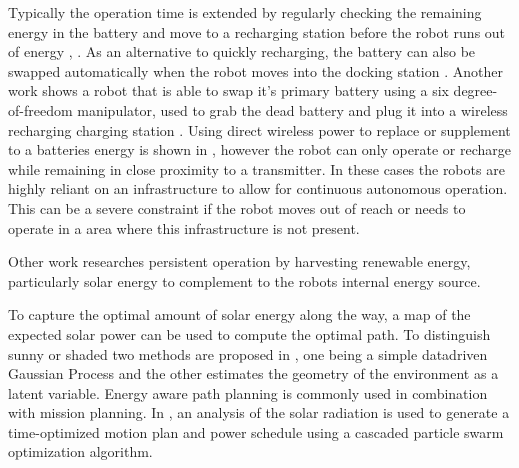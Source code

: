 \documentclass[letterpaper, 10 pt, conference]{ieeeconf}  %
\begin{document}
\cite{karpelson_icra_2014}





Typically the operation time is extended by regularly checking the remaining energy in the battery and move to a recharging station before the robot runs out of energy \cite{pickem_icra_2015}, \cite{rubenstein_icra_2012}.
As an alternative to quickly recharging, the battery can also be swapped automatically when the robot moves into the docking station \cite{kemal_mech_2015}.
Another work shows a robot that is able to swap it's primary battery using a six degree-of-freedom manipulator, used to grab the dead battery and plug it into a wireless recharging charging station \cite{zhang_conel_2013}.
Using direct wireless power to replace or supplement to a batteries energy is shown in \cite{karpelson_icra_2014}, however the robot can only operate or recharge while remaining in close proximity to a transmitter. 
In these cases the robots are highly reliant on an infrastructure to allow for continuous autonomous operation.
This can be a severe constraint if the robot moves out of reach or needs to operate in a area where this infrastructure is not present.

Other work researches persistent operation by harvesting renewable energy, particularly solar energy to complement to the robots internal energy source.


To capture the optimal amount of solar energy along the way, a map of the expected solar power can be used to compute the optimal path. To distinguish sunny or shaded two methods are proposed in \cite{plonski_tranro_2016}, one being a simple datadriven Gaussian Process and the other estimates the geometry of the environment as a latent variable.
Energy aware path planning is commonly used in combination with mission planning.
In \cite{kaplan_icra_2016}, an analysis of the solar radiation is used to generate a time-optimized motion plan and power schedule using a cascaded particle swarm optimization algorithm.
\end{document}
